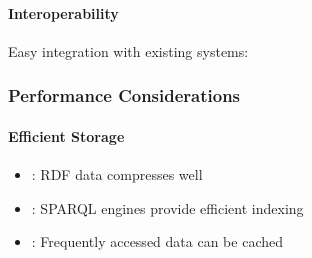 \documentclass[letterpaper,10pt,english]{sphinxmanual}
\begin{document}
\paragraph{Interoperability}
\label{\detokenize{foundational/intro-to-rdf-blockchain:interoperability}}
\sphinxAtStartPar
Easy integration with existing systems:

\begin{sphinxVerbatim}[commandchars=\\\{\}]
 

  
 

  
\end{sphinxVerbatim}


\subsubsection{Performance Considerations}
\label{\detokenize{foundational/intro-to-rdf-blockchain:performance-considerations}}

\paragraph{Efficient Storage}
\label{\detokenize{foundational/intro-to-rdf-blockchain:efficient-storage}}\begin{itemize}
\item {} 
\sphinxAtStartPar
{}: RDF data compresses well

\item {} 
\sphinxAtStartPar
{}: SPARQL engines provide efficient indexing

\item {} 
\sphinxAtStartPar
{}: Frequently accessed data can be cached

\end{itemize}
\end{document}
